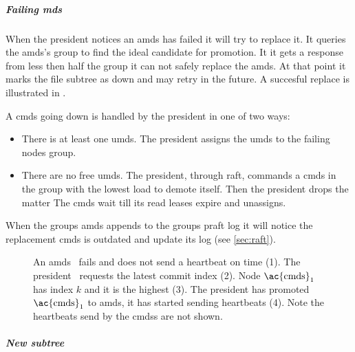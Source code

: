 \subparagraph*{Failing \ac{mds}}
When the president notices an \ac{amds} has failed it will try to replace it. It queries the \ac{amds}'s group to find the ideal candidate for promotion. It it gets a response from less then half the group it can not safely replace the \ac{amds}. At that point it marks the file subtree as down and may retry in the future. A succesful replace is illustrated in .

A \ac{cmds} going down is handled by the president in one of two ways:
\begin{itemize}
	\item There is at least one \ac{umds}. The president assigns the \ac{umds} to the failing nodes group. 
	\item There are no free \ac{umds}. The president, through raft, commands a \ac{cmds} in the group with the lowest load to demote itself. Then the president drops the matter The \ac{cmds} wait till its read leases expire and unassigns.
\end{itemize}
When the groups \ac{amds} appends to the groups \ac{praft} log it will notice the replacement \ac{cmds} is outdated and update its log (see \cref{sec:raft}).

\begin{figure}[htbp]
	\centering
	
	\caption{An \ac{amds}~\amdsLeg{} fails and does not send a heartbeat on time (1). The president~\presidentLeg{} requests the latest commit index (2). Node $\text{\ac{cmds}}_1$~\cmdsLeg{} has index $k$ and it is the highest (3). The president has promoted $\text{\ac{cmds}}_1$ to \ac{amds}, it has started sending heartbeats (4). Note the heartbeats send by the \acp{cmds} are not shown.}
	\label{fig:appoint}
\end{figure}

\subparagraph*{New subtree} \label{sec:loadb}

\begin{figure}[htbp]
	\centering
	
	\caption{}
	\label{fig:subtree}
\end{figure}
